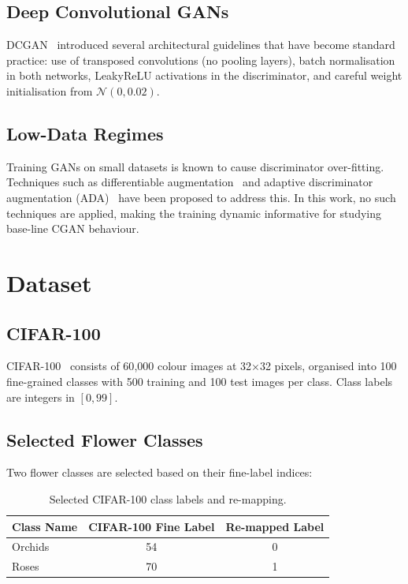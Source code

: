 \documentclass[conference]{IEEEtran}
\begin{document}
\subsection{Deep Convolutional GANs}
DCGAN~\cite{radford2016} introduced several architectural guidelines that have become standard practice: use of transposed convolutions (no pooling layers), batch normalisation in both networks, LeakyReLU activations in the discriminator, and careful weight initialisation from $\mathcal{N}(0, 0.02)$.

\subsection{Low-Data Regimes}
Training GANs on small datasets is known to cause discriminator over-fitting. Techniques such as differentiable augmentation~\cite{zhao2020} and adaptive discriminator augmentation (ADA)~\cite{karras2020} have been proposed to address this. In this work, no such techniques are applied, making the training dynamic informative for studying base-line CGAN behaviour.

\section{Dataset}
\label{sec:dataset}

\subsection{CIFAR-100}
CIFAR-100~\cite{krizhevsky2009} consists of 60{,}000 colour images at 32$\times$32 pixels, organised into 100 fine-grained classes with 500 training and 100 test images per class. Class labels are integers in $[0, 99]$.

\subsection{Selected Flower Classes}
Two flower classes are selected based on their fine-label indices:

\begin{table}[h]
  \centering
  \caption{Selected CIFAR-100 class labels and re-mapping.}
  \begin{tabular}{lcc}
    \toprule
    \textbf{Class Name} & \textbf{CIFAR-100 Fine Label} & \textbf{Re-mapped Label} \\
    \midrule
    Orchids & 54 & 0 \\
    Roses   & 70 & 1 \\
    \bottomrule
  \end{tabular}
  \label{tab:classes}
\end{table}
\end{document}
